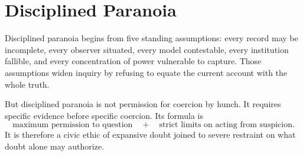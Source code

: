 
\chapter{Disciplined Paranoia}
\label{ch:ch109}

Disciplined paranoia begins from five standing assumptions: every record may be incomplete, every observer situated, every model contestable, every institution fallible, and every concentration of power vulnerable to capture. Those assumptions widen inquiry by refusing to equate the current account with the whole truth.

But disciplined paranoia is not permission for coercion by hunch. It requires specific evidence before specific coercion. Its formula is
\[
\text{maximum permission to question}
\quad+\quad
\text{strict limits on acting from suspicion}.
\]
It is therefore a civic ethic of expansive doubt joined to severe restraint on what doubt alone may authorize.
